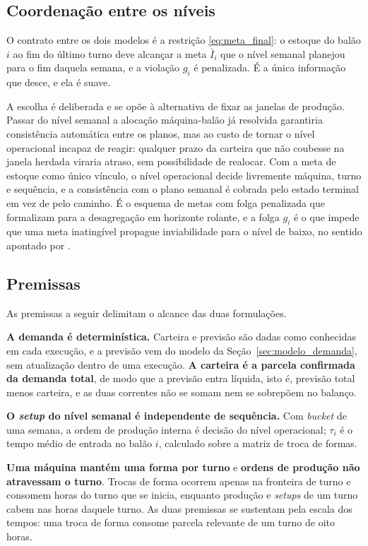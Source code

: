 \documentclass[fleqn,12pt,a4paper]{article}
\begin{document}
\subsection{Coordenação entre os níveis}

O contrato entre os dois modelos é a restrição \eqref{eq:meta_final}: o estoque do balão $i$ ao fim do último turno deve alcançar a meta $\bar{I}_i$ que o nível semanal planejou para o fim daquela semana, e a violação $g_i$ é penalizada. É a única informação que desce, e ela é suave.

A escolha é deliberada e se opõe à alternativa de fixar as janelas de produção. Passar do nível semanal a alocação máquina-balão já resolvida garantiria consistência automática entre os planos, mas ao custo de tornar o nível operacional incapaz de reagir: qualquer prazo da carteira que não coubesse na janela herdada viraria atraso, sem possibilidade de realocar. Com a meta de estoque como único vínculo, o nível operacional decide livremente máquina, turno e sequência, e a consistência com o plano semanal é cobrada pelo estado terminal em vez de pelo caminho. É o esquema de metas com folga penalizada que  formalizam para a desagregação em horizonte rolante, e a folga $g_i$ é o que impede que uma meta inatingível propague inviabilidade para o nível de baixo, no sentido apontado por .

\subsection{Premissas}

As premissas a seguir delimitam o alcance das duas formulações.

\textbf{A demanda é determinística.} Carteira e previsão são dadas como conhecidas em cada execução, e a previsão vem do modelo da Seção~\ref{sec:modelo_demanda}, sem atualização dentro de uma execução. \textbf{A carteira é a parcela confirmada da demanda total}, de modo que a previsão entra líquida, isto é, previsão total menos carteira, e as duas correntes não se somam nem se sobrepõem no balanço.

\textbf{O \textit{setup} do nível semanal é independente de sequência.} Com \textit{bucket} de uma semana, a ordem de produção interna é decisão do nível operacional; $\tau_i$ é o tempo médio de entrada no balão $i$, calculado sobre a matriz de troca de formas.

\textbf{Uma máquina mantém uma forma por turno} e \textbf{ordens de produção não atravessam o turno}. Trocas de forma ocorrem apenas na fronteira de turno e consomem horas do turno que se inicia, enquanto produção e \textit{setups} de um turno cabem nas horas daquele turno. As duas premissas se sustentam pela escala dos tempos: uma troca de forma consome parcela relevante de um turno de oito horas.
\end{document}
